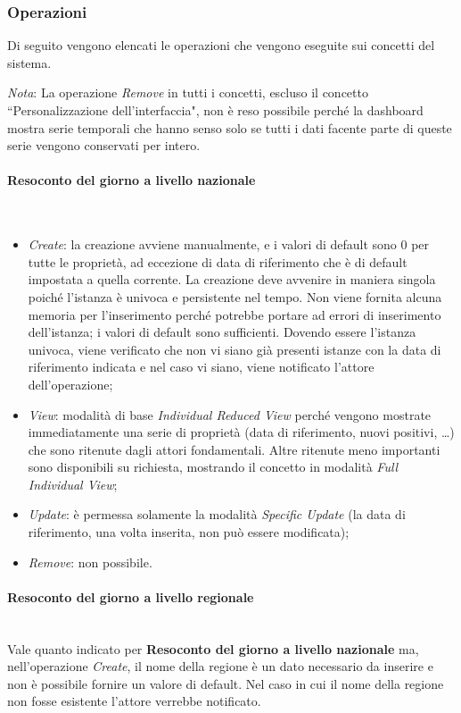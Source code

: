 \subsubsection{Operazioni}
Di seguito vengono elencati le operazioni che vengono eseguite sui concetti del sistema.

\textit{Nota}: La operazione \textit{Remove} in tutti i concetti, escluso il concetto ``Personalizzazione dell'interfaccia", non è reso possibile perché la dashboard mostra serie temporali che hanno senso solo se tutti i dati facente parte di queste serie vengono conservati per intero.

\paragraph{Resoconto del giorno a livello nazionale}\mbox{}\\
\begin{itemize}
    \item \textit{Create}: la creazione avviene manualmente, e i valori di default sono 0 per tutte le proprietà, ad eccezione di data di riferimento che è di default impostata a quella corrente.
    La creazione deve avvenire in maniera singola poiché l'istanza è univoca e persistente nel tempo.
    Non viene fornita alcuna memoria per l'inserimento perché potrebbe portare ad errori di inserimento dell'istanza; i valori di default sono sufficienti.
    Dovendo essere l'istanza univoca, viene verificato che non vi siano già presenti istanze con la data di riferimento indicata e nel caso vi siano, viene notificato l'attore dell'operazione;
    \item \textit{View}: modalità di base \textit{Individual Reduced View} perché vengono mostrate immediatamente una serie di proprietà (data di riferimento, nuovi positivi, \dots) che sono ritenute dagli attori fondamentali.
    Altre ritenute meno importanti sono disponibili su richiesta, mostrando il concetto in modalità \textit{Full Individual View};
    \item \textit{Update}: è permessa solamente la modalità \textit{Specific Update} (la data di riferimento, una volta inserita, non può essere modificata);
    \item \textit{Remove}: non possibile.
\end{itemize}

\paragraph{Resoconto del giorno a livello regionale}\mbox{}\\
Vale quanto indicato per \textbf{Resoconto del giorno a livello nazionale} ma, nell'operazione \textit{Create}, il nome della regione è un dato necessario da inserire e non è possibile fornire un valore di default.
Nel caso in cui il nome della regione non fosse esistente l'attore verrebbe notificato.


